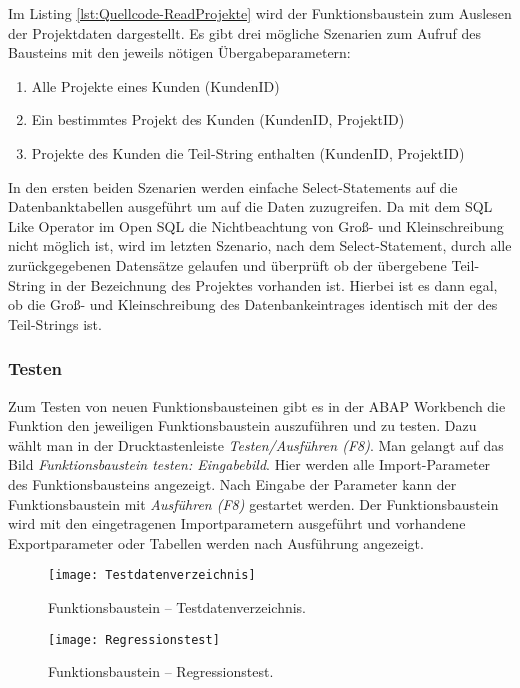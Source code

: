 Im Listing \ref{lst:Quellcode-ReadProjekte} wird der Funktionsbaustein zum Auslesen der Projektdaten dargestellt. Es gibt drei mögliche Szenarien zum Aufruf des Bausteins mit den jeweils nötigen Übergabeparametern:

\begin{enumerate}
	\item Alle Projekte eines Kunden (KundenID)
	\item Ein bestimmtes Projekt des Kunden (KundenID, ProjektID)
	\item Projekte des Kunden die Teil-String enthalten (KundenID, ProjektID)
\end{enumerate}
In den ersten beiden Szenarien werden einfache Select-Statements auf die Datenbanktabellen ausgeführt um auf die Daten zuzugreifen. Da mit dem SQL Like Operator im Open SQL die Nichtbeachtung von Groß- und Kleinschreibung nicht möglich ist, wird im letzten Szenario, nach dem Select-Statement, durch alle zurückgegebenen Datensätze gelaufen und überprüft ob der übergebene Teil-String in der Bezeichnung des Projektes vorhanden ist. Hierbei ist es dann egal, ob die Groß- und Kleinschreibung des Datenbankeintrages identisch mit der des Teil-Strings ist.


\subsubsection{Testen}
Zum Testen von neuen Funktionsbausteinen gibt es in der ABAP Workbench die Funktion den jeweiligen Funktionsbaustein auszuführen und zu testen. Dazu wählt man in der Drucktastenleiste \textit{Testen/Ausführen (F8)}. Man gelangt auf das Bild \textit{Funktionsbaustein testen: Eingabebild}. Hier werden alle Import-Parameter des Funktionsbausteins angezeigt. Nach Eingabe der Parameter kann der Funktionsbaustein mit \textit{Ausführen (F8)} gestartet werden. Der Funktionsbaustein wird mit den eingetragenen Importparametern ausgeführt und vorhandene Exportparameter oder Tabellen werden nach Ausführung angezeigt. 


\begin{figure}[h]
	\centering
	\texttt{[image: Testdatenverzeichnis]} 
	\caption[Funktionsbaustein -- Testdatenverzeichnis]{Funktionsbaustein -- Testdatenverzeichnis.}
	\label{fig:Testdatenverzeichnis}
\end{figure}

\begin{figure}[h]
	\centering
	\texttt{[image: Regressionstest]} 
	\caption[Funktionsbaustein -- Regressionstest]{Funktionsbaustein -- Regressionstest.}
	\label{fig:Regressionstest}
\end{figure}

